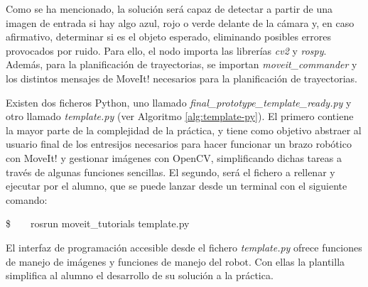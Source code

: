 \documentclass[12pt,spanish,chapterprefix, numbers=noenddot]{book}
\numberwithin{equation}{section}
\numberwithin{figure}{section}
\begin{document}
Como se ha mencionado, la solución será capaz de detectar a partir de una imagen de entrada si hay algo azul, rojo o verde delante de la cámara y, en caso afirmativo, determinar si es el objeto esperado, eliminando posibles errores provocados por ruido. 
Para ello, el nodo importa las librerías \textit{cv2} y \textit{rospy}. Además, para la planificación de trayectorias, se importan \textit{moveit\_commander} y los distintos mensajes de MoveIt! necesarios para la planificación de trayectorias.

Existen dos ficheros Python, uno llamado \textit{final\_prototype\_template\_ready.py} y otro llamado \textit{template.py} (ver Algoritmo \ref{alg:template-py}). 
El primero contiene la mayor parte de la complejidad de la práctica, y tiene como objetivo abstraer al usuario final de los entresijos necesarios para hacer funcionar un brazo robótico con MoveIt! y gestionar imágenes con OpenCV, simplificando dichas tareas a través de algunas funciones sencillas. El segundo, será el fichero a rellenar y ejecutar por el alumno, que se puede lanzar desde un terminal con el siguiente comando: 

\$\ \ \ \ rosrun moveit\_tutorials template.py
    
El interfaz de programación accesible desde el fichero \textit{template.py} ofrece funciones de manejo de imágenes y funciones de manejo del robot. Con ellas la plantilla simplifica al alumno el desarrollo de su solución a la práctica. 
\end{document}
